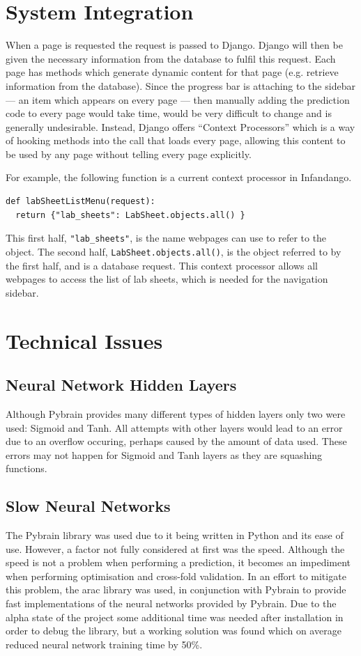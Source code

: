 \section{System Integration}
When a page is requested the request is passed to Django. Django will then be given the necessary information from the database to fulfil this request. Each page has methods which generate dynamic content for that page (e.g. retrieve information from the database). Since the progress bar is attaching to the sidebar --- an item which appears on every page --- then manually adding the prediction code to every page would take time, would be very difficult to change and is generally undesirable. Instead, Django offers ``Context Processors''\cite{django_cp} which is a way of hooking methods into the call that loads every page, allowing this content to be used by any page without telling every page explicitly. 

For example, the following function is a current context processor in Infandango.

\begin{verbatim}
def labSheetListMenu(request):
  return {"lab_sheets": LabSheet.objects.all() }
\end{verbatim}

This first half, {\tt"lab_sheets"}, is the name webpages can use to refer to the object. The second half, {\tt LabSheet.objects.all()}, is the object referred to by the first half, and is a database request. This context processor allows all webpages to access the list of lab sheets, which is needed for the navigation sidebar.

\section{Technical Issues}

\subsection{Neural Network Hidden Layers}
Although Pybrain provides many different types of hidden layers only two were used: Sigmoid and Tanh. All attempts with other layers would lead to an error due to an overflow occuring, perhaps caused by the amount of data used. These errors may not happen for Sigmoid and Tanh layers as they are squashing functions.

\subsection{Slow Neural Networks}
The Pybrain library was used due to it being written in Python and its ease of use. However, a factor not fully considered at first was the speed. Although the speed is not a problem when performing a prediction, it becomes an impediment when performing optimisation and cross-fold validation. In an effort to mitigate this problem, the arac library\cite{arac_site} was used, in conjunction with Pybrain to provide fast implementations of the neural networks provided by Pybrain. Due to the alpha state of the project some additional time was needed after installation in order to debug the library, but a working solution was found which on average reduced neural network training time by 50\%.

